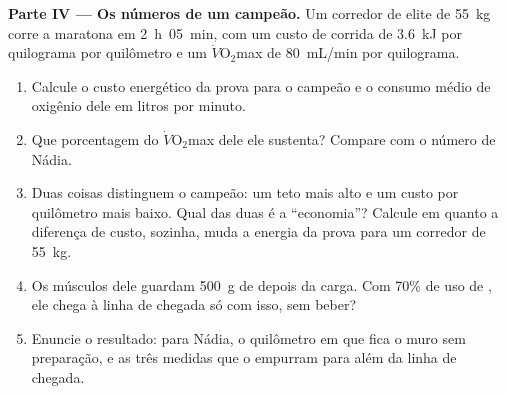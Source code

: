 \begin{problem}
\medskip
\noindent\textbf{Parte IV --- Os números de um campeão.}
Um corredor de elite de \qty{55}{kg} corre a maratona em \qty{2}{h}\,
\qty{05}{min}, com um custo de corrida de \qty{3.6}{kJ} por quilograma
por quilômetro e um $\dot V\!\mathrm{O_2}$max de \qty{80}{mL/min} por
quilograma.
\begin{enumerate}[resume]
  \item Calcule o custo energético da prova para o campeão e o consumo
        médio de oxigênio dele em litros por minuto.
  \item Que porcentagem do $\dot V\!\mathrm{O_2}$max dele ele sustenta?
        Compare com o número de Nádia.
  \item Duas coisas distinguem o campeão: um teto mais alto e um custo
        por quilômetro mais baixo. Qual das duas é a ``economia''?
        Calcule em quanto a diferença de custo, sozinha, muda a energia
        da prova para um corredor de \qty{55}{kg}.
  \item Os músculos dele guardam \qty{500}{g} de  depois da
        carga. Com 70\% de uso de , ele chega à linha de
        chegada só com isso, sem beber?
  \item Enuncie o resultado: para Nádia, o quilômetro em que fica o
        muro sem preparação, e as três medidas que o empurram para além
        da linha de chegada.
\end{enumerate}
\end{problem}
